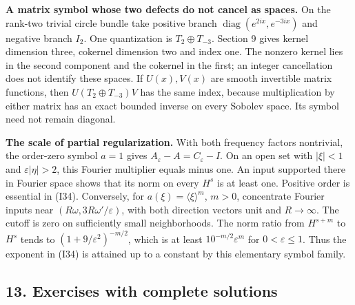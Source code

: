 \documentclass[
  11pt,
]{article}
\makeatletter
\let\ReaderOriginalAnchorStart\hyper@anchorstart
\let\ReaderOriginalAnchorEnd\hyper@anchorend
\let\ReaderPendingAliases\@empty
\def\ReaderArmAliases#1{\gdef\ReaderPendingAliases{#1}}
\def\hyper@anchorstart#1{\ReaderIfNativeAnchorTF{#1}{\ReaderPendingAliases\global\let\ReaderPendingAliases\@empty}{}\ReaderOriginalAnchorStart{#1}}
\makeatother
\begin{document}
\textbf{A matrix symbol whose two defects do not cancel as spaces.} On
the rank-two trivial circle bundle take positive branch
\(\operatorname{diag}(e^{2ix},e^{-3ix})\) and negative branch \(I_2\).
One quantization is \(T_2\oplus T_{-3}\). Section 9 gives kernel
dimension three, cokernel dimension two and index one. The nonzero
kernel lies in the second component and the cokernel in the first; an
integer cancellation does not identify these spaces. If \(U(x),V(x)\)
are smooth invertible matrix functions, then \(U(T_2\oplus T_{-3})V\)
has the same index, because multiplication by either matrix has an exact
bounded inverse on every Sobolev space. Its symbol need not remain
diagonal.

\textbf{The scale of partial regularization.} With both frequency
factors nontrivial, the order-zero symbol \(a=1\) gives
\(A_\varepsilon-A=C_\varepsilon-I\). On an open set with \(|\xi|<1\) and
\(\varepsilon|\eta|>2\), this Fourier multiplier equals minus one. An
input supported there in Fourier space shows that its norm on every
\(H^s\) is at least one. Positive order is essential in (I34).
Conversely, for \(a(\xi)=\langle\xi\rangle^m\), \(m>0\), concentrate
Fourier inputs near \((R\omega,3R\omega'/\varepsilon)\), with both
direction vectors unit and \(R\to\infty\). The cutoff is zero on
sufficiently small neighborhoods. The norm ratio from \(H^{s+m}\) to
\(H^s\) tends to \((1+9/\varepsilon^2)^{-m/2}\), which is at least
\(10^{-m/2}\varepsilon^m\) for \(0<\varepsilon\leq1\). Thus the exponent
in (I34) is attained up to a constant by this elementary symbol family.

\ReaderArmAliases{\ReaderOriginalAnchorStart{AN03-GSP-001}\ReaderOriginalAnchorEnd\begingroup\expandafter\def\csname @currentHref\endcsname{AN03-GSP-001}\label{AN03-GSP-001}\endgroup\ReaderOriginalAnchorStart{an03-gsp-001-exercises-with-complete-solutions}\ReaderOriginalAnchorEnd\begingroup\expandafter\def\csname @currentHref\endcsname{an03-gsp-001-exercises-with-complete-solutions}\label{an03-gsp-001-exercises-with-complete-solutions}\endgroup\ReaderOriginalAnchorStart{13-exercises-with-complete-solutions}\ReaderOriginalAnchorEnd\begingroup\expandafter\def\csname @currentHref\endcsname{13-exercises-with-complete-solutions}\label{13-exercises-with-complete-solutions}\endgroup}
\subsection{13. Exercises with complete
solutions}\label{exercises-with-complete-solutions}
\end{document}
